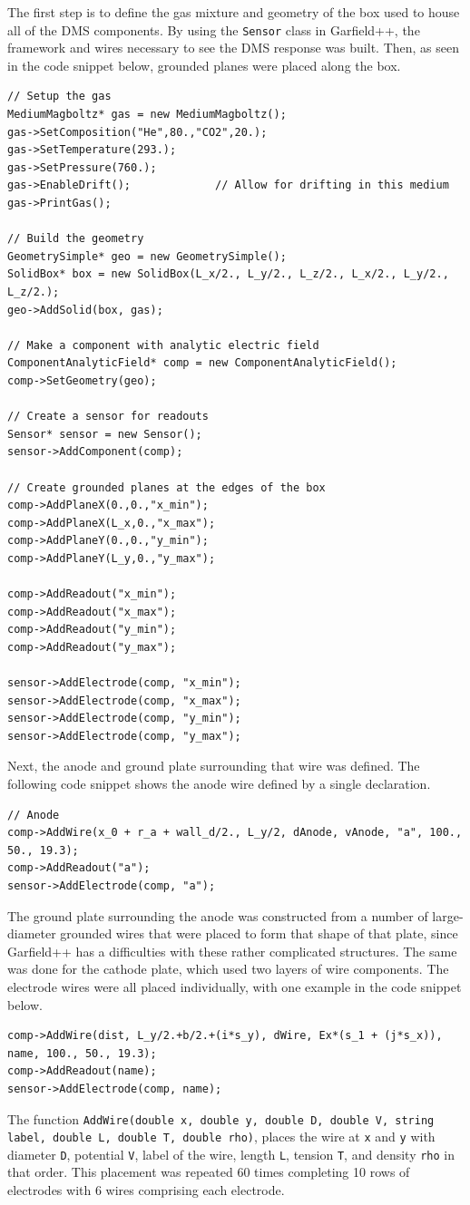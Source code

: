 The first step is to define the gas mixture and geometry of the box used to house all of the DMS components. By using the  \lstinline|Sensor| class in Garfield++, the framework and wires necessary to see the DMS response was built. Then, as seen in the code snippet below, grounded planes were placed along the box. 
\label{code:g++geodef}
\begin{lstlisting} 
// Setup the gas
MediumMagboltz* gas = new MediumMagboltz();
gas->SetComposition("He",80.,"CO2",20.);
gas->SetTemperature(293.);
gas->SetPressure(760.);
gas->EnableDrift();             // Allow for drifting in this medium
gas->PrintGas();

// Build the geometry
GeometrySimple* geo = new GeometrySimple();
SolidBox* box = new SolidBox(L_x/2., L_y/2., L_z/2., L_x/2., L_y/2., L_z/2.);
geo->AddSolid(box, gas);

// Make a component with analytic electric field
ComponentAnalyticField* comp = new ComponentAnalyticField();
comp->SetGeometry(geo);

// Create a sensor for readouts
Sensor* sensor = new Sensor();
sensor->AddComponent(comp);

// Create grounded planes at the edges of the box
comp->AddPlaneX(0.,0.,"x_min");
comp->AddPlaneX(L_x,0.,"x_max");
comp->AddPlaneY(0.,0.,"y_min");
comp->AddPlaneY(L_y,0.,"y_max");

comp->AddReadout("x_min");
comp->AddReadout("x_max");
comp->AddReadout("y_min");
comp->AddReadout("y_max");

sensor->AddElectrode(comp, "x_min");
sensor->AddElectrode(comp, "x_max");
sensor->AddElectrode(comp, "y_min");
sensor->AddElectrode(comp, "y_max");
\end{lstlisting}
Next, the anode and ground plate surrounding that wire was defined. The following code snippet shows the anode wire defined by a single declaration.
\begin{lstlisting} 
// Anode
comp->AddWire(x_0 + r_a + wall_d/2., L_y/2, dAnode, vAnode, "a", 100., 50., 19.3);
comp->AddReadout("a");
sensor->AddElectrode(comp, "a");
\end{lstlisting}
The ground plate surrounding the anode was constructed from a number of large-diameter grounded wires that were placed to form that shape of that plate, since Garfield++ has a difficulties with these rather complicated structures. The same was done for the cathode plate, which used two layers of wire components. The electrode wires were all placed individually, with one example in the code snippet below.
\begin{lstlisting}
comp->AddWire(dist, L_y/2.+b/2.+(i*s_y), dWire, Ex*(s_1 + (j*s_x)), name, 100., 50., 19.3);
comp->AddReadout(name);
sensor->AddElectrode(comp, name);
\end{lstlisting}
The function \lstinline|AddWire(double x, double y, double D, double V, string label, double L, double T, double rho)|, places the wire at \lstinline|x| and \lstinline|y| with diameter \lstinline|D|, potential \lstinline|V|, label of the wire, length \lstinline|L|, tension \lstinline|T|, and density \lstinline|rho| in that order. This placement was repeated 60 times completing 10 rows of electrodes with 6 wires comprising each electrode.

